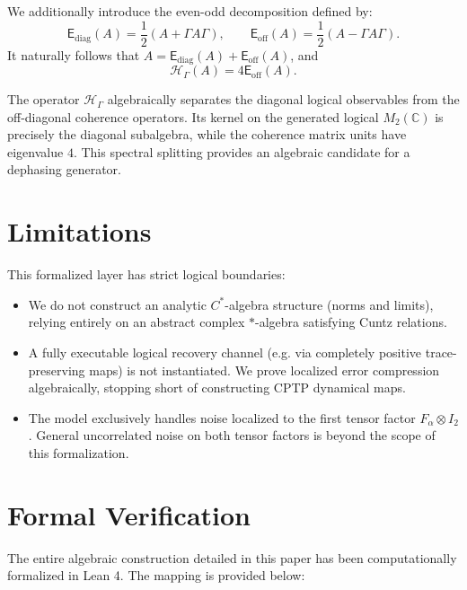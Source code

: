 \documentclass[11pt,a4paper]{article}
\begin{document}
We additionally introduce the even-odd decomposition defined by:
\[
\mathsf E_{\mathrm{diag}}(A) = \frac12(A+\Gamma A\Gamma), \qquad
\mathsf E_{\mathrm{off}}(A) = \frac12(A-\Gamma A\Gamma).
\]
It naturally follows that $A = \mathsf E_{\mathrm{diag}}(A) + \mathsf E_{\mathrm{off}}(A)$, and
\[
\mathcal H_\Gamma(A) = 4 \mathsf E_{\mathrm{off}}(A).
\]

The operator $\mathcal H_\Gamma$ algebraically separates the diagonal logical observables from the off-diagonal coherence operators. Its kernel on the generated logical $M_2(\mathbb C)$ is precisely the diagonal subalgebra, while the coherence matrix units have eigenvalue $4$. This spectral splitting provides an algebraic candidate for a dephasing generator.

\section{Limitations}
This formalized layer has strict logical boundaries:
\begin{itemize}
    \item We do not construct an analytic $C^*$-algebra structure (norms and limits), relying entirely on an abstract complex $*$-algebra satisfying Cuntz relations.
    \item A fully executable logical recovery channel (e.g. via completely positive trace-preserving maps) is not instantiated. We prove localized error compression algebraically, stopping short of constructing CPTP dynamical maps.
    \item The model exclusively handles noise localized to the first tensor factor $F_\alpha \otimes I_2$. General uncorrelated noise on both tensor factors is beyond the scope of this formalization.
\end{itemize}

\section{Formal Verification}
The entire algebraic construction detailed in this paper has been computationally formalized in Lean 4. The mapping is provided below:
\end{document}
